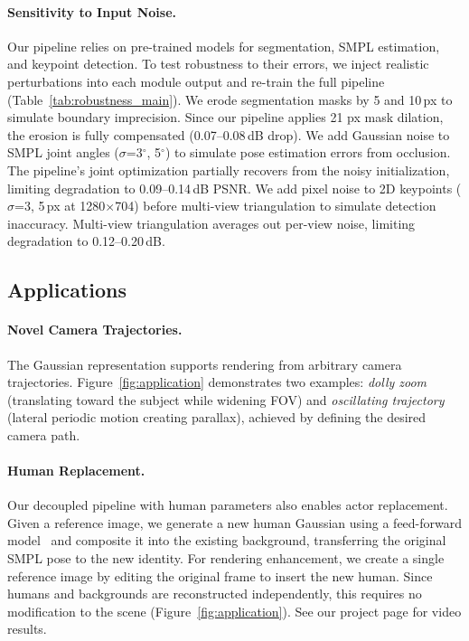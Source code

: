 \documentclass[acmtog]{acmart}
\newcommand{\degree}{$^\circ$}
\begin{document}
\paragraph{Sensitivity to Input Noise.}
Our pipeline relies on pre-trained models for segmentation, SMPL estimation, and keypoint detection. To test robustness to their errors, we inject realistic perturbations into each module output and re-train the full pipeline (Table~\ref{tab:robustness_main}).
We erode segmentation masks by 5 and 10\,px to simulate boundary imprecision. Since our pipeline applies 21 px mask dilation, the erosion is fully compensated (0.07--0.08\,dB drop).
We add Gaussian noise to SMPL joint angles ($\sigma$=3\degree, 5\degree) to simulate pose estimation errors from occlusion. The pipeline's joint optimization partially recovers from the noisy initialization, limiting degradation to 0.09--0.14\,dB PSNR.
We add pixel noise to 2D keypoints ($\sigma$=3, 5\,px at 1280$\times$704) before multi-view triangulation to simulate detection inaccuracy. Multi-view triangulation averages out per-view noise, limiting degradation to 0.12--0.20\,dB.




\subsection{Applications}

\paragraph{Novel Camera Trajectories.}
The Gaussian representation supports rendering from arbitrary camera trajectories. Figure~\ref{fig:application} demonstrates two examples: \textit{dolly zoom} (translating toward the subject while widening FOV) and \textit{oscillating trajectory} (lateral periodic motion creating parallax), achieved by defining the desired camera path.
\paragraph{Human Replacement.}
Our decoupled pipeline with human parameters also enables actor replacement. Given a reference image, we generate a new human Gaussian using a feed-forward model~\cite{qiu2025lhm} and composite it into the existing background, transferring the original SMPL pose to the new identity. For rendering enhancement, we create a single reference image by editing the original frame to insert the new human. Since humans and backgrounds are reconstructed independently, this requires no modification to the scene (Figure~\ref{fig:application}). See our project page for video results.
\end{document}
